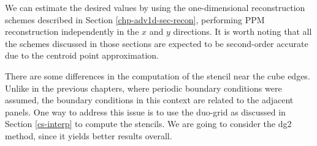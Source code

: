 We can estimate the desired values by using the one-dimensional reconstruction schemes 
described in Section \ref{chp-adv1d-sec-recon},
performing PPM reconstruction independently in the $x$ and $y$ directions. 
It is worth noting that all the schemes discussed in those sections are 
expected to be second-order accurate due to the centroid point approximation.

There are  some differences in the computation of the stencil near the cube edges.
Unlike in the previous chapters, where periodic boundary conditions were assumed, 
the boundary conditions in this context are related to the adjacent panels. 
One way to address this issue is to use the duo-grid as discussed  in Section \ref{cs-interp} to compute the stencils. 
We are going to consider the dg2 method, since it yields better results overall.


